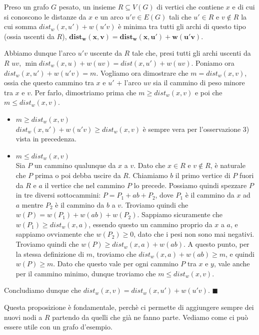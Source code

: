 \documentclass[11pt, a4paper, titlepage, oneside]{scrbook}
\begin{document}
\begin{Proposizione}[]
\label{propos-grafi-pesati}
Preso un grafo $G$ pesato, un insieme $R \subseteq V(G)$ di vertici che contiene $x$ e di cui si conoscono le distanze da $x$ e un arco $u'v \in E(G)$ tali che $u' \in R$ e $v \notin R$ la cui somma $dist_w(x,u') + w(u'v)$ è minima tra tutti gli archi di questo tipo (ossia uscenti da $R$), $\bm{dist_w(x,v) = dist_w(x,u') + w(u'v)}$.
\end{Proposizione}

\Dimostrazione \nopagebreak

Abbiamo dunque l'arco $u'v$ uscente da $R$ tale che, presi tutti gli archi uscenti da $R$ $uv$, $\min dist_w(x,u) + w(uv) = dist(x,u') + w(uv)$. Poniamo ora $dist_w(x,u') + w(u'v) = m$. Vogliamo ora dimostrare che $m = dist_w(x,v)$, ossia che questo cammino tra $x$ e $u'$ + l'arco $uv$ sia il cammino di peso minore tra $x$ e $v$. Per farlo, dimostriamo prima che $m \geq dist_w(x,v)$ e poi che $m \leq dist_w(x,v)$. 
\begin{itemize}
    \item $m \geq dist_w(x,v)$ \\
    $dist_w(x,u') + w(u'v) \geq dist_w(x,v)$ è sempre vera per l'osservazione 3) vista in precedenza.
    \item $m \leq dist_w(x,v)$ \\
    Sia $P$ un cammino qualunque da $x$ a $v$. Dato che $x \in R$ e $v \notin R$, è naturale che $P$ prima o poi debba uscire da $R$. Chiamiamo $b$ il primo vertice di $P$ fuori da $R$ e $a$ il vertice che nel cammino $P$ lo precede. Possiamo quindi spezzare $P$ in tre diversi sottocammini: $P = P_1 + ab + P_2$, dove $P_1$ è il cammino da $x$ ad $a$ mentre $P_2$ è il cammino da $b$ a $v$. Troviamo quindi che $w(P) = w(P_1) + w(ab) + w(P_2)$. Sappiamo sicuramente che $w(P_1) \geq dist_w(x,a)$, essendo questo un cammino proprio da $x$ a $a$, e sappiamo ovviamente che $w(P_2) \geq 0$, dato che i pesi non sono mai negativi. Troviamo quindi che $w(P) \geq dist_w(x,a) + w(ab)$. A questo punto, per la stessa definizione di $m$, troviamo che $dist_w(x,a) + w(ab) \geq m$, e quindi $w(P) \geq m$. Dato che questo vale per ogni cammino $P$ tra $x$ e $y$, vale anche per il cammino minimo, dunque troviamo che $m \leq dist_w(x,v)$.
\end{itemize}

Concludiamo dunque che $dist_w(x,v) = dist_w(x,u') + w(u'v)$. $\blacksquare$

Questa proposizione è fondamentale, perchè ci permette di aggiungere sempre dei nuovi nodi a $R$ partendo da quelli che già ne fanno parte. Vediamo come ci può essere utile con un grafo d'esempio.
\end{document}
